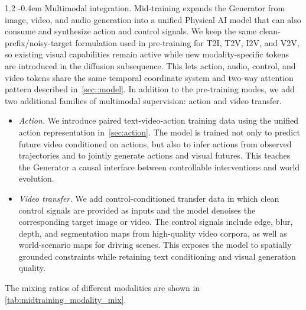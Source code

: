 \documentclass{llmxive}
\makeatletter
\providecommand{\paragraph}{  \@startsection{paragraph}{4}{\z@}    {1\baselineskip \@plus .2\baselineskip}    {-0.4em}    {\normalfont\normalsize\bfseries}}
\makeatother
\begin{document}
\paragraph{Multimodal integration.}
Mid-training expands the Generator from image, video, and audio generation into a unified Physical AI model that can also consume and synthesize action and control signals. We keep the same clean-prefix/noisy-target formulation used in pre-training for T2I, T2V, I2V, and V2V, so existing visual capabilities remain active while new modality-specific tokens are introduced in the diffusion subsequence. This lets action, audio, control, and video tokens share the same temporal coordinate system and two-way attention pattern described in~\cref{sec::model}. In addition to the pre-training modes, we add two additional families of multimodal supervision: action and video transfer.
\begin{itemize}
\item \textit{Action.}
We introduce paired text-video-action training data using the unified action representation in~\cref{sec:action}. The model is trained not only to predict future video conditioned on actions, but also to infer actions from observed trajectories and to jointly generate actions and visual futures. This teaches the Generator a causal interface between controllable interventions and world evolution.
\item \textit{Video transfer.}
We add control-conditioned transfer data in which clean control signals are provided as inputs and the model denoises the corresponding target image or video. The control signals include edge, blur, depth, and segmentation maps from high-quality video corpora, as well as world-scenario maps for driving scenes. This exposes the model to spatially grounded constraints while retaining text conditioning and visual generation quality.
\end{itemize}
The mixing ratios of different modalities are shown in \cref{tab:midtraining_modality_mix}.
\end{document}
